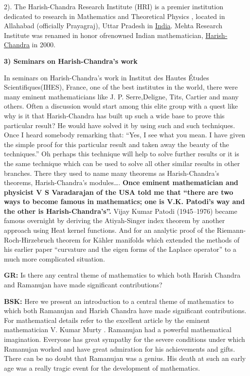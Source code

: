 2). The Harish-Chandra Research Institute (HRI) is a premier institution dedicated to research in Mathematics and Theoretical Physics , located in Allahabad (officially Prayagraj), Uttar Pradesh in \underline{India}. Mehta  Research Institute was renamed in honor of\break renowned Indian mathematician, \underline{Harish-Chandra} in 2000.

\textbf{3) Seminars on Harish-Chandra’s work}

In seminars on Harish-Chandra’s work in  Institut des Hautes Études Scientifiques(IHES), France, one of the best institutes in the world, there were many eminent mathematicians like J. P. Serre,\break Deligne, Tits, Cartier and many others.  Often a discussion would start among this elite group with a quest like why is it that Harish-Chandra has built up such a wide base to prove this particular result?  He would have solved it by using such and such techniques. Once I heard somebody remarking that: “Yes, I see what you mean. I have given the simple proof for this particular result and taken away the beauty of the techniques.” Oh perhaps this technique will help to solve further results or it is the same technique which can be used to solve all other similar results in other branches.  There they used to name many theorems as Harish-Chandra’s theorems, Harish-Chandra’s modules….  \textbf{Once eminent mathematician and physicist V S Varadarajan of the USA told me that “there are two ways to become famous in mathematics; one is V.K. Patodi’s way and the other is Harish-Chandra’s”.} Vijay Kumar Patodi (1945--1976) became famous overnight by deriving the Atiyah-Singer index theorem by another approach using Heat kernel functions. And for an analytic proof of the Riemann-Roch-Hirzebruch theorem for Kähler manifolds which extended the methods of his earlier paper “curvature and the eigen forms of the Laplace operator” to a much more complicated situation.

\textbf{GR:} Is there any central theme of mathematics to which both Harish Chandra and Ramanujan have made significant contributions?

\textbf{BSK:} Here we present an introduction to a central theme of mathematics to which both Ramanujan and Harish Chandra have made significant contributions. For mathematical details refer to the excellent article by the eminent mathematician V. Kumar Murty \cite{chap17-key10VKM}. Ramanujan had a powerful mathematical imagination.  Everyone has great sympathy for the severe conditions under which Ramanujan worked and have great admiration for his achievements and gifts. There can be no doubt that Ramanujan was a genius. His death at such an early age was a really tragic event for the development of mathematics.
 
